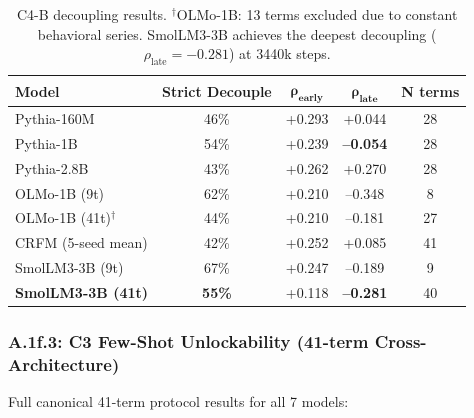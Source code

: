 \documentclass[10pt]{article} %
\begin{document}
\begin{table}[H]
\centering
\small
\begin{tabular}{|l|c|c|c|c|}
\hline
\textbf{Model} & \textbf{Strict Decouple} & $\mathbf{\rho_{\text{early}}}$ & $\mathbf{\rho_{\text{late}}}$ & \textbf{N terms} \\
\hline
Pythia-160M & 46\% & +0.293 & +0.044 & 28 \\
Pythia-1B & 54\% & +0.239 & \textbf{--0.054} & 28 \\
Pythia-2.8B & 43\% & +0.262 & +0.270 & 28 \\
OLMo-1B (9t) & 62\% & +0.210 & --0.348 & 8 \\
OLMo-1B (41t)$^\dagger$ & 44\% & +0.210 & --0.181 & 27 \\
CRFM (5-seed mean) & 42\% & +0.252 & +0.085 & 41 \\
SmolLM3-3B (9t) & 67\% & +0.247 & --0.189 & 9 \\
\textbf{SmolLM3-3B (41t)} & \textbf{55\%} & +0.118 & \textbf{--0.281} & 40 \\
\hline
\end{tabular}
\caption{C4-B decoupling results. $^\dagger$OLMo-1B: 13 terms excluded due to constant behavioral series. SmolLM3-3B achieves the deepest decoupling ($\rho_{\text{late}} = -0.281$) at 3440k steps.}
\label{tab:a1f2_c4b}
\end{table}

\subsubsection*{A.1f.3: C3 Few-Shot Unlockability (41-term Cross-Architecture)}

Full canonical 41-term protocol results for all 7 models:
\end{document}
